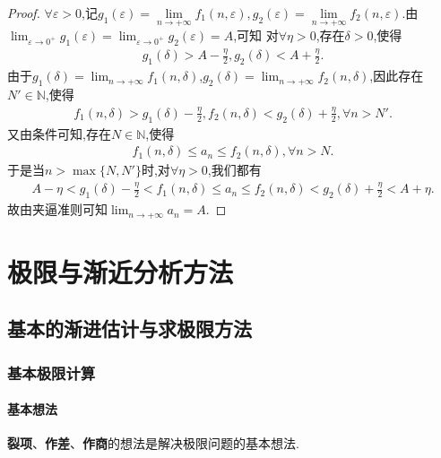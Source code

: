 \documentclass[lang=cn,newtx,10pt,scheme=chinese]{elegantbook}
\begin{document}
\begin{proof}
$\forall \varepsilon>0$,记$g_1\left( \varepsilon \right) =\underset{n\rightarrow +\infty}{\lim}f_1(n,\varepsilon ),g_2\left( \varepsilon \right) =\underset{n\rightarrow +\infty}{\lim}f_2(n,\varepsilon ).$由\(\lim_{\varepsilon \to 0^+}g_1(\varepsilon)=\lim_{\varepsilon \to 0^+}g_2(\varepsilon)=A\),可知
对\(\forall \eta > 0\),存在\(\delta > 0\),使得
\begin{align*}
g_1(\delta) > A - \frac{\eta}{2},g_2(\delta) < A + \frac{\eta}{2}.
\end{align*}
由于\(g_1(\delta)=\lim_{n \to +\infty}f_1(n,\delta)\),\(g_2(\delta)=\lim_{n \to +\infty}f_2(n,\delta)\),因此存在\(N'\in \mathbb{N}\),使得
\begin{align*}
f_1(n,\delta) > g_1(\delta) - \frac{\eta}{2},f_2(n,\delta) < g_2(\delta) + \frac{\eta}{2},\forall n > N'.
\end{align*}
又由条件可知,存在\(N\in \mathbb{N}\),使得
\begin{align*}
f_1(n,\delta) \leqslant a_n \leqslant f_2(n,\delta),\forall n > N .
\end{align*}
于是当\(n > \max\{N,N'\}\)时,对\(\forall \eta > 0\),我们都有
\begin{align*}
A - \eta < g_1(\delta) - \frac{\eta}{2} < f_1(n,\delta) \leqslant a_n \leqslant f_2(n,\delta) < g_2(\delta) + \frac{\eta}{2} < A + \eta.
\end{align*}
故由夹逼准则可知\(\lim_{n \to +\infty}a_n = A\). 
\end{proof}


\chapter{极限与渐近分析方法}

\section{基本的渐进估计与求极限方法}

\subsection{基本极限计算}

\subsubsection{基本想法}

\textbf{裂项}、\textbf{作差}、\textbf{作商}的想法是解决极限问题的基本想法.
\end{document}
